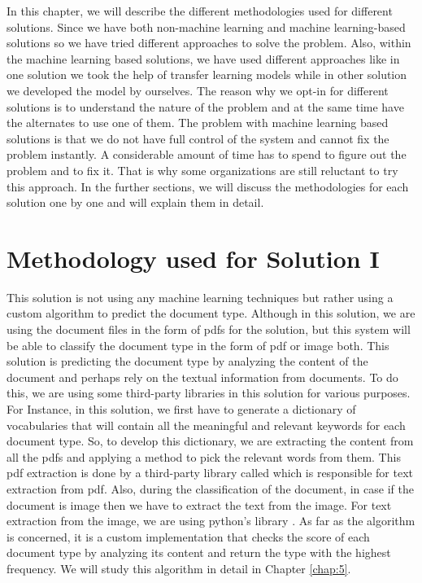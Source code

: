 \par
In this chapter, we will describe the different methodologies used for different solutions. Since we have both non-machine learning and machine learning-based solutions so we have tried different approaches to solve the problem. Also, within the machine learning based solutions, we have used different approaches like in one solution we took the help of transfer learning models while in other solution we developed the model by ourselves. The reason why we opt-in for different solutions is to understand the nature of the problem and at the same time have the alternates to use one of them. The problem with machine learning based solutions is that we do not have full control of the system and cannot fix the problem instantly. A considerable amount of time has to spend to figure out the problem and to fix it. That is why some organizations are still reluctant to try this approach. In the further sections, we will discuss the methodologies for each solution one by one and will explain them in detail. 
\section{Methodology used for Solution I}
\par
This solution is not using any machine learning techniques but rather using a custom algorithm to predict the document type. Although in this solution, we are using the document files in the form of pdfs for the solution, but this system will be able to classify the document type in the form of pdf or image both. This solution is predicting the document type by analyzing the content of the document and perhaps rely on the textual information from documents. To do this, we are using some third-party libraries in this solution for various purposes. For Instance, in this solution, we first have to generate a dictionary of vocabularies that will contain all the meaningful and relevant keywords for each document type. So, to develop this dictionary, we are extracting the content from all the pdfs and applying a method to pick the relevant words from them. This pdf extraction is done by a third-party library called  \cite{tika} which is responsible for text extraction from pdf. Also, during the classification of the document, in case if the document is image then we have to extract the text from the image. For text extraction from the image, we are using python's library  \cite{pytesseract}. As far as the algorithm is concerned, it is a custom implementation that checks the score of each document type by analyzing its content and return the type with the highest frequency. We will study this algorithm in detail in Chapter \ref{chap:5}.
